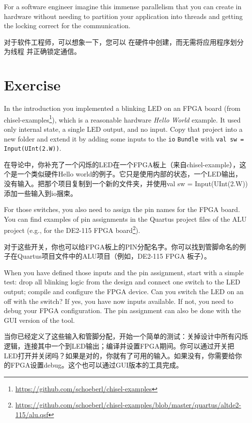 \documentclass[%
    10pt,
    headinclude, footexclude,
    openright, %
    notitlepage,
    cleardoubleempty,
    headsepline,
    pointlessnumbers,
    bibtotoc, idxtotoc,
    ]{scrbook}
\newcommand{\code}[1]{{\small{\texttt{#1}}}}
\newcommand{\myref}[2]{\href{#1}{#2}}
\renewcommand{\myref}[2]{{#2}{\footnote{\url{#1}}}}
\begin{document}
For a software engineer imagine this immense parallelism that you can
create in hardware without needing to partition your application into threads
and getting the locking correct for the communication.


对于软件工程师，可以想象一下，您可以
在硬件中创建，而无需将应用程序划分为线程
并正确锁定通信。

\section{Exercise}

In the introduction you implemented a blinking LED on an FPGA board
(from \myref{https://github.com/schoeberl/chisel-examples}{chisel-examples}), which is a reasonable
hardware \emph{Hello World} example. It used only internal state, a single LED output, and no input.
Copy that project into a new folder and extend it by adding some inputs to the \code{io} \code{Bundle}
with \code{val sw = Input(UInt(2.W))}.

在导论中，你补充了一个闪烁的LED在一个FPGA板上（来自chisel-example），这个是一个类似硬件Hello world的例子。它只是使用内部的状态，一个LED输出，没有输入。把那个项目复制到一个新的文件夹，并使用val sw = Input(UInt(2.W))添加一些输入到io捆束。



\noindent For those switches, you also need to assign the pin names for the FPGA board.
You can find examples of pin assignments in the Quartus project files of the ALU project
(e.g., for the \myref{https://github.com/schoeberl/chisel-examples/blob/master/quartus/altde2-115/alu.qsf}{DE2-115
FPGA board}).

对于这些开关，你也可以给FPGA板上的PIN分配名字。你可以找到管脚命名的例子在Quartus项目文件中的ALU项目（例如，DE2-115 FPGA 板子）。

When you have defined those inputs and the pin assignment, start with a simple test:
drop all blinking logic from the design and connect one switch to the LED output;
compile and configure the FPGA device. Can you switch the LED on an off with the switch?
If yes, you have now inputs available. If not, you need to debug your FPGA configuration.
The pin assignment can also be done with the GUI version of the tool.

当你已经定义了这些输入和管脚分配，开始一个简单的测试：关掉设计中所有闪烁逻辑，连接其中一个到LED输出；编译并设置FPGA期间。你可以通过开关把LED打开并关闭吗？如果是对的，你就有了可用的输入。如果没有，你需要给你的FPGA设置debug。这个也可以通过GUI版本的工具完成。
\end{document}
